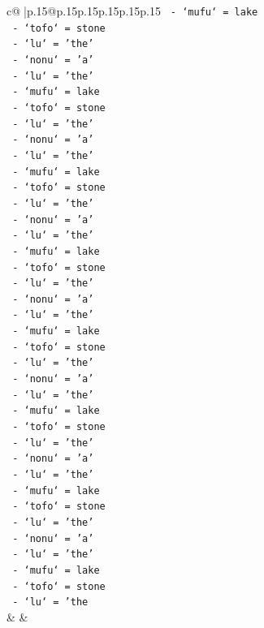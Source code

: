 \documentclass{article}
\begin{document}
{\begin{supertabular}{c@{$\;$}|p{.15\linewidth}@{}p{.15\linewidth}p{.15\linewidth}p{.15\linewidth}p{.15\linewidth}p{.15\linewidth}}
{{{\texttt{      {-} `mufu` = lake} \\
\texttt{      {-} `tofo` = stone} \\
\texttt{      {-} `lu` = 'the'} \\
\texttt{      {-} `nonu` = 'a'} \\
\texttt{      {-} `lu` = 'the'} \\
\texttt{      {-} `mufu` = lake} \\
\texttt{      {-} `tofo` = stone} \\
\texttt{      {-} `lu` = 'the'} \\
\texttt{      {-} `nonu` = 'a'} \\
\texttt{      {-} `lu` = 'the'} \\
\texttt{      {-} `mufu` = lake} \\
\texttt{      {-} `tofo` = stone} \\
\texttt{      {-} `lu` = 'the'} \\
\texttt{      {-} `nonu` = 'a'} \\
\texttt{      {-} `lu` = 'the'} \\
\texttt{      {-} `mufu` = lake} \\
\texttt{      {-} `tofo` = stone} \\
\texttt{      {-} `lu` = 'the'} \\
\texttt{      {-} `nonu` = 'a'} \\
\texttt{      {-} `lu` = 'the'} \\
\texttt{      {-} `mufu` = lake} \\
\texttt{      {-} `tofo` = stone} \\
\texttt{      {-} `lu` = 'the'} \\
\texttt{      {-} `nonu` = 'a'} \\
\texttt{      {-} `lu` = 'the'} \\
\texttt{      {-} `mufu` = lake} \\
\texttt{      {-} `tofo` = stone} \\
\texttt{      {-} `lu` = 'the'} \\
\texttt{      {-} `nonu` = 'a'} \\
\texttt{      {-} `lu` = 'the'} \\
\texttt{      {-} `mufu` = lake} \\
\texttt{      {-} `tofo` = stone} \\
\texttt{      {-} `lu` = 'the'} \\
\texttt{      {-} `nonu` = 'a'} \\
\texttt{      {-} `lu` = 'the'} \\
\texttt{      {-} `mufu` = lake} \\
\texttt{      {-} `tofo` = stone} \\
\texttt{      {-} `lu` = 'the} \\
            }
        }
    }
    & & \\ \\


\end{supertabular}}
\end{document}
